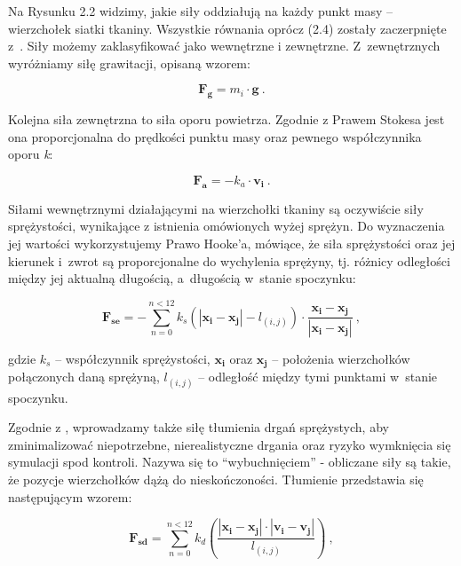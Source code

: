 			
			
			
			Na Rysunku 2.2 widzimy, jakie siły oddziałują na każdy punkt masy -- wierzchołek siatki tkaniny. Wszystkie równania oprócz (2.4) zostały zaczerpnięte z~\cite{cloth-dobre-wzory}. Siły możemy zaklasyfikować jako wewnętrzne i zewnętrzne. Z~zewnętrznych wyróżniamy siłę grawitacji, opisaną wzorem:
			
			\begin{equation}
			\mathbf{F_{g}} = m_{i} \cdot \mathbf{g} \ .
			\end{equation}
			
			Kolejna siła zewnętrzna to siła oporu powietrza. Zgodnie z Prawem Stokesa jest ona proporcjonalna do prędkości punktu masy oraz pewnego współczynnika oporu \emph{k}:
			
			\begin{equation}
			\mathbf{F_{a}} = -k_{a} \cdot \mathbf{v_{i}} \ .
			\end{equation}
			
			Siłami wewnętrznymi działającymi na wierzchołki tkaniny są oczywiście siły sprężystości, wynikające z istnienia omówionych wyżej sprężyn. Do wyznaczenia jej wartości wykorzystujemy Prawo Hooke'a, mówiące, że siła sprężystości oraz jej kierunek i~zwrot są proporcjonalne do wychylenia sprężyny, tj. różnicy odległości między jej aktualną długością, a~długością w~stanie spoczynku:
			
			\begin{equation}
			\mathbf{F_{se}} = - \sum_{n = 0}^{n < 12} k_{s} (|\mathbf{x_{i}} - \mathbf{x_{j}}| - l_{(i, j)}) \cdot \frac{\mathbf{x_{i}} - \mathbf{x_{j}}}{|\mathbf{x_{i}} - \mathbf{x_{j}}|} \ ,
			\end{equation}
			
			gdzie \(k_{s}\) -- współczynnik sprężystości, \(\mathbf{x_{i}}\) oraz \(\mathbf{x_{j}}\) -- położenia wierzchołków połączonych daną sprężyną, \(l_{(i, j)}\) -- odległość między tymi punktami w~stanie spoczynku.
			
			Zgodnie z \cite{receptury}, wprowadzamy także siłę tłumienia drgań sprężystych, aby zminimalizować niepotrzebne, nierealistyczne drgania oraz ryzyko wymknięcia się symulacji spod kontroli. Nazywa się to ``wybuchnięciem'' - obliczane siły są takie, że pozycje wierzchołków dążą do nieskończoności. Tłumienie przedstawia się następującym wzorem:
			
			\begin{equation}
			\mathbf{F_{sd}} = \sum_{n = 0}^{n < 12} k_{d} (\frac{|\mathbf{x_{i}} - \mathbf{x_{j}}| \cdot |\mathbf{v_{i}} - \mathbf{v_{j}}|}{l_{(i, j)}}) \ ,
			\end{equation}
			
